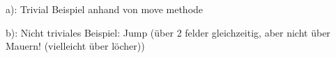 

a): Trivial Beispiel anhand von move methode

b): Nicht triviales Beispiel: Jump (über 2 felder gleichzeitig, aber nicht über Mauern! (vielleicht über löcher))
